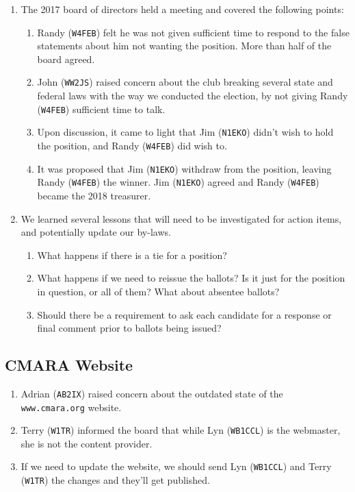 \documentclass[10pt,letterpaper]{article}
\begin{document}
\begin{enumerate}
\begin{enumerate}
  \end{enumerate}
  \item The 2017 board of directors held a meeting and covered the following points:
  \begin{enumerate}
    \item Randy (\texttt{W4FEB}) felt he was not given sufficient time to respond to the false statements about him not wanting the position. More than half of the board agreed.
    \item John (\texttt{WW2JS}) raised concern about the club breaking several state and federal laws with the way we conducted the election, by not giving Randy (\texttt{W4FEB}) sufficient time to talk.
    \item Upon discussion, it came to light that Jim (\texttt{N1EKO}) didn't wish to hold the position, and Randy (\texttt{W4FEB}) did wish to.
    \item It was proposed that Jim (\texttt{N1EKO}) withdraw from the position, leaving Randy (\texttt{W4FEB}) the winner. Jim (\texttt{N1EKO}) agreed and Randy (\texttt{W4FEB}) became the 2018 treasurer.
  \end{enumerate}
  \item We learned several lessons that will need to be investigated for action items, and potentially update our by-laws.
  \begin{enumerate}
    \item What happens if there is a tie for a position?
    \item What happens if we need to reissue the ballots? Is it just for the position in question, or all of them? What about absentee ballots?
    \item Should there be a requirement to ask each candidate for a response or final comment prior to ballots being issued?
  \end{enumerate}
\end{enumerate}

\subsection{CMARA Website}
\begin{enumerate}
  \item Adrian (\texttt{AB2IX}) raised concern about the outdated state of the \texttt{www.cmara.org} website.
  \item Terry (\texttt{W1TR}) informed the board that while Lyn (\texttt{WB1CCL}) is the webmaster, she is not the content provider.
  \item If we need to update the website, we should send Lyn (\texttt{WB1CCL}) and Terry (\texttt{W1TR}) the changes and they'll get published.
\end{enumerate}
\end{document}
